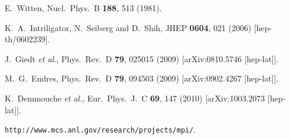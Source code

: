 \begin{thebibliography}{99}
  E.~Witten,
  Nucl.\ Phys.\ B {\bf 188}, 513 (1981).
  
  K.~A.~Intriligator, N.~Seiberg and D.~Shih,
  JHEP {\bf 0604}, 021 (2006)
  [hep-th/0602239].
  
%  
%  

  J.~Giedt {\it et al.},
  Phys.\ Rev.\ D {\bf 79}, 025015 (2009)
  [arXiv:0810.5746 [hep-lat]].
  
  M.~G.~Endres,
  Phys.\ Rev.\ D {\bf 79}, 094503 (2009)
  [arXiv:0902.4267 [hep-lat]].
  
  K.~Demmouche {\it et al.},
  Eur.\ Phys.\ J.\ C {\bf 69}, 147 (2010)
  [arXiv:1003.2073 [hep-lat]].
  
 
{\tt http://www.mcs.anl.gov/research/projects/mpi/}.


\end{thebibliography}
